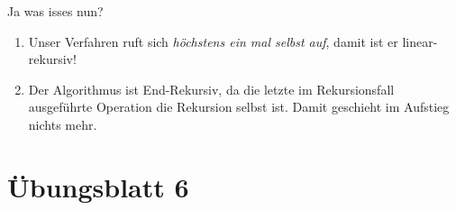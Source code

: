 {\taskenum
\begin{frame}{Ja was isses nun?}
\begin{enumerate}[<+(1)->]
    \itemsep12pt
    \item {}\pause
    Unser Verfahren ruft sich \emph{höchstens ein mal selbst auf}, damit ist er linear-rekursiv!
    \item {}\pause
    Der Algorithmus ist End-Rekursiv, da die letzte im Rekursionsfall ausgeführte Operation die Rekursion selbst ist.
    Damit geschieht im Aufstieg nichts mehr.
\end{enumerate}
\end{frame}
}


%

\section{Übungsblatt 6}
